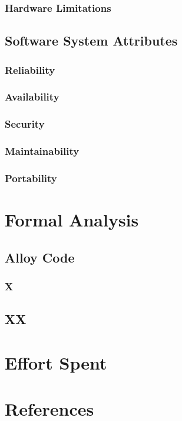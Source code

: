 \documentclass{article}
\begin{document}
\subsubsection{Hardware Limitations}

\subsection{Software System Attributes}

\subsubsection{Reliability}

\subsubsection{Availability}

\subsubsection{Security}

\subsubsection{Maintainability}

\subsubsection{Portability}

\section{Formal Analysis}

\subsection{Alloy Code}

\subsubsection{X}

\subsection{XX}

\section{Effort Spent}

\section{References }








\end{document}
